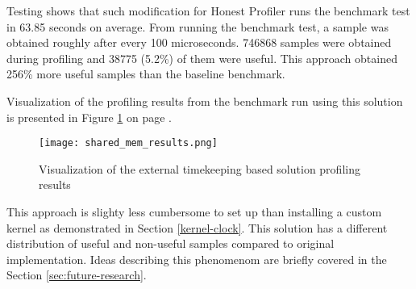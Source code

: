 \documentclass[..thesis.tex]{subfiles}
\begin{document}

Testing shows that such modification for Honest Profiler runs the benchmark test in 63.85 seconds on average.  From running the benchmark test, a sample was obtained roughly after every 100 microseconds. 746868 samples were obtained during profiling and 38775 (5.2\%) of them were useful. This approach obtained 256\% more useful samples than the baseline benchmark.

Visualization of the profiling results from the benchmark run using this solution is presented in Figure \ref{fig:shared-mem-results} on page \pageref{fig:shared-mem-results}.
\begin{figure}[H]
\texttt{[image: shared\_mem\_results.png]}
\caption{Visualization of the external timekeeping based solution profiling results}
\label{fig:shared-mem-results}
\end{figure} 

This approach is slighty less cumbersome to set up than installing a custom kernel as demonstrated in Section \ref{kernel-clock}. This solution has a different distribution of useful and non-useful samples compared to original implementation. Ideas describing this phenomenom are briefly covered in the Section \ref{sec:future-research}.

\end{document}
